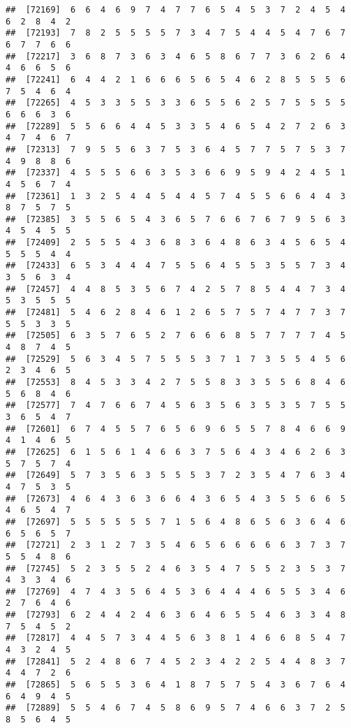 \documentclass[
]{book}
\begin{document}
\begin{verbatim}
##  [72169]  6  6  4  6  9  7  4  7  7  6  5  4  5  3  7  2  4  5  4  6  2  8  4  2
##  [72193]  7  8  2  5  5  5  5  7  3  4  7  5  4  4  5  4  7  6  7  6  7  7  6  6
##  [72217]  3  6  8  7  3  6  3  4  6  5  8  6  7  7  3  6  2  6  4  4  6  6  5  6
##  [72241]  6  4  4  2  1  6  6  6  5  6  5  4  6  2  8  5  5  5  6  7  5  4  6  4
##  [72265]  4  5  3  3  5  5  3  3  6  5  5  6  2  5  7  5  5  5  5  6  6  6  3  6
##  [72289]  5  5  6  6  4  4  5  3  3  5  4  6  5  4  2  7  2  6  3  4  7  4  6  7
##  [72313]  7  9  5  5  6  3  7  5  3  6  4  5  7  7  5  7  5  3  7  4  9  8  8  6
##  [72337]  4  5  5  5  6  6  3  5  3  6  6  9  5  9  4  2  4  5  1  4  5  6  7  4
##  [72361]  1  3  2  5  4  4  5  4  4  5  7  4  5  5  6  6  4  4  3  8  7  5  7  5
##  [72385]  3  5  5  6  5  4  3  6  5  7  6  6  7  6  7  9  5  6  3  4  5  4  5  5
##  [72409]  2  5  5  5  4  3  6  8  3  6  4  8  6  3  4  5  6  5  4  5  5  5  4  4
##  [72433]  6  5  3  4  4  4  7  5  5  6  4  5  5  3  5  5  7  3  4  3  5  6  3  4
##  [72457]  4  4  8  5  3  5  6  7  4  2  5  7  8  5  4  4  7  3  4  5  3  5  5  5
##  [72481]  5  4  6  2  8  4  6  1  2  6  5  7  5  7  4  7  7  3  7  5  5  3  3  5
##  [72505]  6  3  5  7  6  5  2  7  6  6  6  8  5  7  7  7  7  4  5  4  8  7  4  5
##  [72529]  5  6  3  4  5  7  5  5  5  3  7  1  7  3  5  5  4  5  6  2  3  4  6  5
##  [72553]  8  4  5  3  3  4  2  7  5  5  8  3  3  5  5  6  8  4  6  5  6  8  4  6
##  [72577]  7  4  7  6  6  7  4  5  6  3  5  6  3  5  3  5  7  5  5  3  6  5  4  7
##  [72601]  6  7  4  5  5  7  6  5  6  9  6  5  5  7  8  4  6  6  9  4  1  4  6  5
##  [72625]  6  1  5  6  1  4  6  6  3  7  5  6  4  3  4  6  2  6  3  5  7  5  7  4
##  [72649]  5  7  3  5  6  3  5  5  5  3  7  2  3  5  4  7  6  3  4  4  7  5  3  5
##  [72673]  4  6  4  3  6  3  6  6  4  3  6  5  4  3  5  5  6  6  5  4  6  5  4  7
##  [72697]  5  5  5  5  5  5  7  1  5  6  4  8  6  5  6  3  6  4  6  6  5  6  5  7
##  [72721]  2  3  1  2  7  3  5  4  6  5  6  6  6  6  6  3  7  3  7  5  5  4  8  6
##  [72745]  5  2  3  5  5  2  4  6  3  5  4  7  5  5  2  3  5  3  7  4  3  3  4  6
##  [72769]  4  7  4  3  5  6  4  5  3  6  4  4  4  6  5  5  3  4  6  2  7  6  4  6
##  [72793]  6  2  4  4  2  4  6  3  6  4  6  5  5  4  6  3  3  4  8  7  5  4  5  2
##  [72817]  4  4  5  7  3  4  4  5  6  3  8  1  4  6  6  8  5  4  7  4  3  2  4  5
##  [72841]  5  2  4  8  6  7  4  5  2  3  4  2  2  5  4  4  8  3  7  4  4  7  2  6
##  [72865]  5  6  5  5  3  6  4  1  8  7  5  7  5  4  3  6  7  6  4  6  4  9  4  5
##  [72889]  5  5  4  6  7  4  5  8  6  9  5  7  4  6  6  3  7  2  5  8  5  6  4  5

\end{verbatim}
\end{document}
